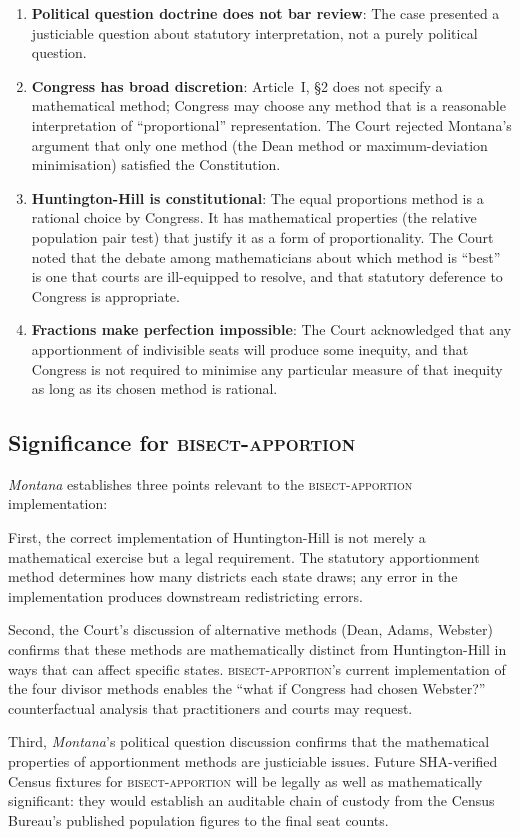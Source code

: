 \begin{enumerate}
  \item \textbf{Political question doctrine does not bar review}:
    The case presented a justiciable question about statutory
    interpretation, not a purely political question.
  \item \textbf{Congress has broad discretion}: Article~I, \S2 does not
    specify a mathematical method; Congress may choose any method that
    is a reasonable interpretation of ``proportional'' representation.
    The Court rejected Montana's argument that only one method
    (the Dean method or maximum-deviation minimisation) satisfied
    the Constitution.
  \item \textbf{Huntington-Hill is constitutional}: The equal proportions
    method is a rational choice by Congress.
    It has mathematical properties (the relative population pair test)
    that justify it as a form of proportionality.
    The Court noted that the debate among mathematicians about which
    method is ``best'' is one that courts are ill-equipped to resolve,
    and that statutory deference to Congress is appropriate.
  \item \textbf{Fractions make perfection impossible}: The Court
    acknowledged that any apportionment of indivisible seats will
    produce some inequity, and that Congress is not required
    to minimise any particular measure of that inequity as long as
    its chosen method is rational.
\end{enumerate}

\subsection{Significance for \textsc{bisect-apportion}}

\textit{Montana} establishes three points relevant to the
\textsc{bisect-apportion} implementation:

First, the correct implementation of Huntington-Hill is not merely
a mathematical exercise but a legal requirement.
The statutory apportionment method determines how many districts each
state draws; any error in the implementation produces downstream
redistricting errors.

Second, the Court's discussion of alternative methods
(Dean, Adams, Webster) confirms that these methods are mathematically
distinct from Huntington-Hill in ways that can affect specific states.
\textsc{bisect-apportion}'s current implementation of the four divisor methods
enables
the ``what if Congress had chosen Webster?'' counterfactual analysis
that practitioners and courts may request.

Third, \textit{Montana}'s political question discussion confirms that
the mathematical properties of apportionment methods are justiciable
issues.
Future SHA-verified Census fixtures for \textsc{bisect-apportion} will be
legally as well as mathematically significant: they would establish an auditable
chain of custody from the Census Bureau's published population figures to the
final seat counts.
